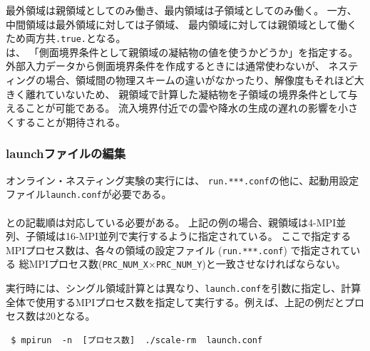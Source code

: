 \noindent 最外領域は親領域としてのみ働き、最内領域は子領域としてのみ働く。
一方、中間領域は最外領域に対しては子領域、
最内領域に対しては親領域として働くため両方共\verb|.true.|となる。\\
は、
「側面境界条件として親領域の凝結物の値を使うかどうか」を指定する。
外部入力データから側面境界条件を作成するときには通常使わないが、
ネスティングの場合、領域間の物理スキームの違いがなかったり、解像度もそれほど大きく離れていないため、
親領域で計算した凝結物を子領域の境界条件として与えることが可能である。
流入境界付近での雲や降水の生成の遅れの影響を小さくすることが期待される。



\subsubsection{launchファイルの編集}
\label{subsubsec:launch}
オンライン・ネスティング実験の実行には、
\verb|run.***.conf|の他に、起動用設定ファイル\verb|launch.conf|が必要である。\\

\\

\noindent
{}との記載順は対応している必要がある。
上記の例の場合、親領域は4-MPI並列、子領域は16-MPI並列で実行するように指定されている。
ここで指定するMPIプロセス数は、各々の領域の設定ファイル (\verb|run.***.conf|) で指定されている
総MPIプロセス数(\verb|PRC_NUM_X|$\times$\verb|PRC_NUM_Y|)と一致させなければならない。

実行時には、シングル領域計算とは異なり、\verb|launch.conf|を引数に指定し、計算全体で使用するMPIプロセス数を指定して実行する。例えば、上記の例だとプロセス数は20となる。
\begin{verbatim}
 $ mpirun  -n  [プロセス数]  ./scale-rm  launch.conf
\end{verbatim}

